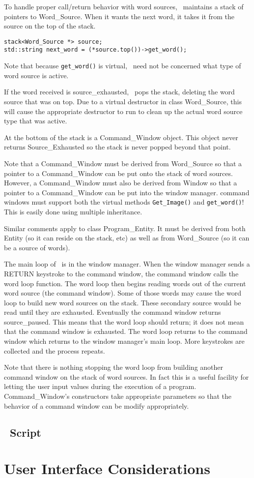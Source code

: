 \documentclass{report}
\begin{document}
To handle proper call/return behavior with word sources, \CLAC\ maintains a stack of pointers to
Word\_Source. When it wants the next word, it takes it from the source on the top of the stack.

\begin{verbatim}
stack<Word_Source *> source;
std::string next_word = (*source.top())->get_word();
\end{verbatim}

Note that because \texttt{get\_word()} is virtual, \CLAC\ need not be concerned what type of
word source is active.

If the word received is source\_exhausted, \CLAC\ pops the stack, deleting the word source that
was on top. Due to a virtual destructor in class Word\_Source, this will cause the appropriate
destructor to run to clean up the actual word source type that was active.

At the bottom of the stack is a Command\_Window object. This object never returns
Source\_Exhausted so the stack is never popped beyond that point.

Note that a Command\_Window must be derived from Word\_Source so that a pointer to a
Command\_Window can be put onto the stack of word sources. However, a Command\_Window must also
be derived from Window so that a pointer to a Command\_Window can be put into the window
manager. command windows must support both the virtual methods \texttt{Get\_Image()} and
\texttt{get\_word()}! This is easily done using multiple inheritance.

Similar comments apply to class Program\_Entity. It must be derived from both Entity (so it can reside on the stack, etc) as well as from Word\_Source (so it can be a source of words).

The main loop of \CLAC\ is in the window manager. When the window manager sends a RETURN
keystroke to the command window, the command window calls the word loop function. The word loop
then begins reading words out of the current word source (the command window). Some of those
words may cause the word loop to build new word sources on the stack. These secondary source
would be read until they are exhausted. Eventually the command window returns source\_paused.
This means that the word loop should return; it does not mean that the command window is
exhausted. The word loop returns to the command window which returns to the window manager's
main loop. More keystrokes are collected and the process repeats.

Note that there is nothing stopping the word loop from building another command window on the
stack of word sources. In fact this is a useful facility for letting the user input values
during the execution of a program. Command\_Window's constructors take appropriate parameters so
that the behavior of a command window can be modify appropriately.

\section{\CLAC\ Script}

\chapter{User Interface Considerations}
\end{document}
